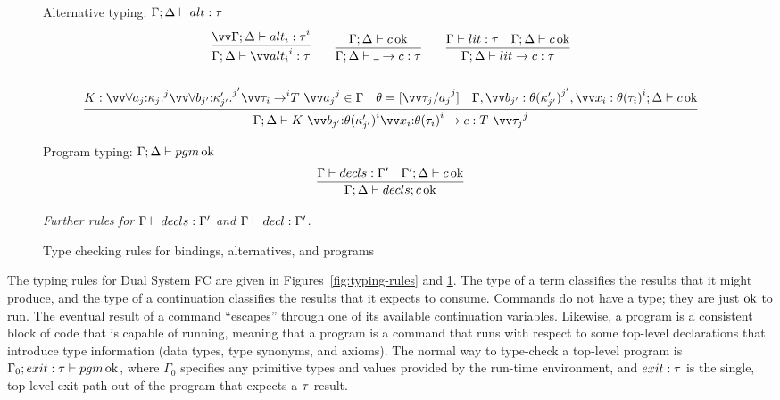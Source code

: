 \documentclass{article}
\begin{document}
\begin{figure}[h]
Alternative typing: $\Gamma; \Delta \vdash alt : \tau$
\begin{gather*}
  \infer
  {\Gamma;\Delta \vdash \vect[i]{\analt_i} : \ty}
  {
    \vect[i]{\Gamma;\Delta \vdash \analt_i : \ty}
  }
  \qquad
  \infer
  {\Gamma;\Delta \vdash \alt{\blank}{\com} : \ty}
  {\Gamma;\Delta \vdash \com \Ok}
  \qquad
  \infer
  {\Gamma;\Delta \vdash \alt{\lit}{\com} : \ty}
  {
    \Gamma \vdash \lit : \ty
    &
    \Gamma;\Delta \vdash \com \Ok
  }
  \\\\
  \infer
  {
    \Gamma;\Delta
    \vdash
    \alt{K ~ \vect[i]{\ann{b_{j'}}{\theta(\ki'_{j'})}} \vect[i]{\ann{x_{i}}{\theta(\ty_{i})}}}{\com}
    :
    T ~ \vect[j]{\tau_j}
  }
  {
    K
    :
    \vect[j]{\forall\ann{a_j}{\ki_j}.} \vect[j']{\forall\ann{b_{j'}}{\ki'_{j'}}.}
      \vect[i]{\ty_{i} \to} T ~ \vect[j]{a_j}
    \in
    \Gamma
    &
    \theta = [\vect[j]{\tau_j/a_j}]
    &
    \Gamma,
    \vect[j']{b_{j'}:\theta(\ki'_{j'})},
    \vect[i]{x_{i}:\theta(\ty_{i})};
    \Delta
    \vdash
    \com \Ok
  }
\end{gather*}

Program typing: $\Gamma;\Delta \vdash pgm \operatorname{ok}$
\begin{gather*}
  \infer
  {\Gamma; \Delta \vdash \decls; c \Ok}
  {
    \Gamma \vdash \decls : \Gamma'
    &
    \Gamma';\Delta \vdash c \Ok
  }
\end{gather*}

\emph{Further rules for $\Gamma \vdash decls : \Gamma'$ and
  $\Gamma \vdash decl : \Gamma'$.}
\caption{Type checking rules for bindings, alternatives, and programs}
\label{fig:typing-rules-binds}
\end{figure}

The typing rules for Dual System FC are given in Figures~\ref{fig:typing-rules}
and \ref{fig:typing-rules-binds}.  The type of a term classifies the results
that it might produce, and the type of a continuation classifies the results
that it expects to consume.  Commands do not have a type; they are just $\operatorname{ok}$ to
run.  The eventual result of a command ``escapes'' through one of its available
continuation variables.  Likewise, a program is a consistent block of code that
is capable of running, meaning that a program is a command that runs with
respect to some top-level declarations that introduce type information (data
types, type synonyms, and axioms).  The normal way to type-check a top-level
program is $\Gamma_0;exit:\tau \vdash pgm \operatorname{ok}$, where $\Gamma_0$ specifies any
primitive types and values provided by the run-time environment, and $exit:\tau$
is the single, top-level exit path out of the program that expects a $\tau$
result.
\end{document}
